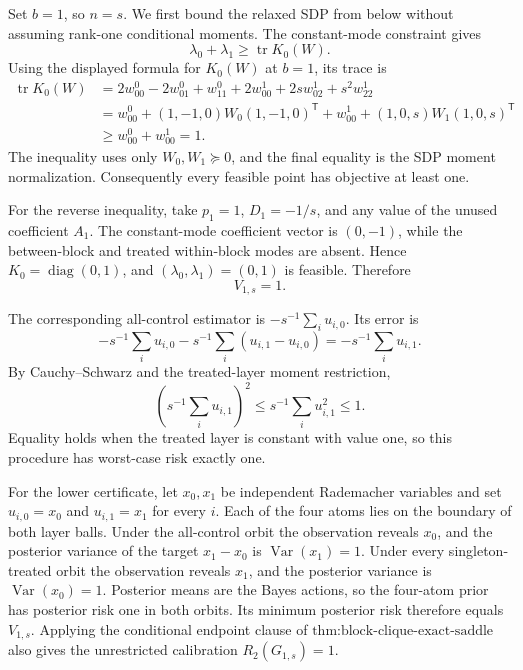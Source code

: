 Set \(b=1\), so \(n=s\).  We first bound the relaxed SDP from below without assuming rank-one conditional moments.  The constant-mode constraint gives
\[
\lambda_0+\lambda_1\ge\operatorname{tr}K_0(W).
\]
Using the displayed formula for \(K_0(W)\) at \(b=1\), its trace is
\[
\begin{aligned}
\operatorname{tr}K_0(W)
&=2w^0_{00}-2w^0_{01}+w^0_{11}
  +2w^1_{00}+2sw^1_{02}+s^2w^1_{22}\\
&=w^0_{00}+(1,-1,0)W_0(1,-1,0)^{\mathsf T}
  +w^1_{00}+(1,0,s)W_1(1,0,s)^{\mathsf T}\\
&\ge w^0_{00}+w^1_{00}=1.
\end{aligned}
\]
The inequality uses only \(W_0,W_1\succeq0\), and the final equality is the SDP moment normalization.  Consequently every feasible point has objective at least one.

For the reverse inequality, take \(p_1=1\), \(D_1=-1/s\), and any value of the unused coefficient \(A_1\).  The constant-mode coefficient vector is \((0,-1)\), while the between-block and treated within-block modes are absent.  Hence \(K_0=\operatorname{diag}(0,1)\), and \((\lambda_0,\lambda_1)=(0,1)\) is feasible.  Therefore
\[
V_{1,s}=1.
\]

The corresponding all-control estimator is \(-s^{-1}\sum_i u_{i,0}\).  Its error is
\[
-s^{-1}\sum_i u_{i,0}
-s^{-1}\sum_i(u_{i,1}-u_{i,0})
=-s^{-1}\sum_i u_{i,1}.
\]
By Cauchy--Schwarz and the treated-layer moment restriction,
\[
\left(s^{-1}\sum_i u_{i,1}\right)^2
\le s^{-1}\sum_i u_{i,1}^2\le1.
\]
Equality holds when the treated layer is constant with value one, so this procedure has worst-case risk exactly one.

For the lower certificate, let \(x_0,x_1\) be independent Rademacher variables and set \(u_{i,0}=x_0\) and \(u_{i,1}=x_1\) for every \(i\).  Each of the four atoms lies on the boundary of both layer balls.  Under the all-control orbit the observation reveals \(x_0\), and the posterior variance of the target \(x_1-x_0\) is \(\operatorname{Var}(x_1)=1\).  Under every singleton-treated orbit the observation reveals \(x_1\), and the posterior variance is \(\operatorname{Var}(x_0)=1\).  Posterior means are the Bayes actions, so the four-atom prior has posterior risk one in both orbits.  Its minimum posterior risk therefore equals \(V_{1,s}\).  Applying the conditional endpoint clause of \(\text{thm:block-clique-exact-saddle}\) also gives the unrestricted calibration \(R_2(G_{1,s})=1\).